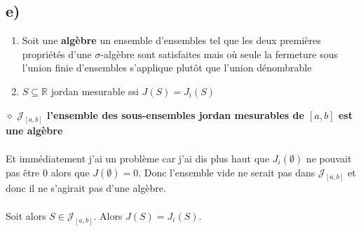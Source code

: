 \documentclass[a4paper,10pt]{article}
\begin{document}
\subsection*{e)}
\begin{enumerate}
	\item Soit une \textbf{algèbre} un ensemble d'ensembles tel que les deux premières propriétés d'une $\sigma$-algèbre sont satisfaites mais où seule la fermeture sous l'union finie d'ensembles s'applique plutôt que l'union dénombrable
	\item $S \subseteq \mathbb{R}$ jordan mesurable ssi $J(S) = J_i (S)$
\end{enumerate}
$\diamond$ \textbf{$\mathcal{J}_{[a,b]}$ l'ensemble des sous-ensembles jordan mesurables de $[a,b]$ est une algèbre}
\\
\\
Et immédiatement j'ai un problème car j'ai dis plus haut que $J_i (\emptyset)$ ne pouvait pas être 0 alors que $J (\emptyset) = 0$. Donc l'ensemble vide ne serait pas dans $\mathcal{J}_{[a,b]}$ et donc il ne s'agirait pas d'une algèbre.
\\
\\
Soit alors $S \in \mathcal{J}_{[a,b]}$. Alors $J(S) = J_i (S)$.
\end{document}
